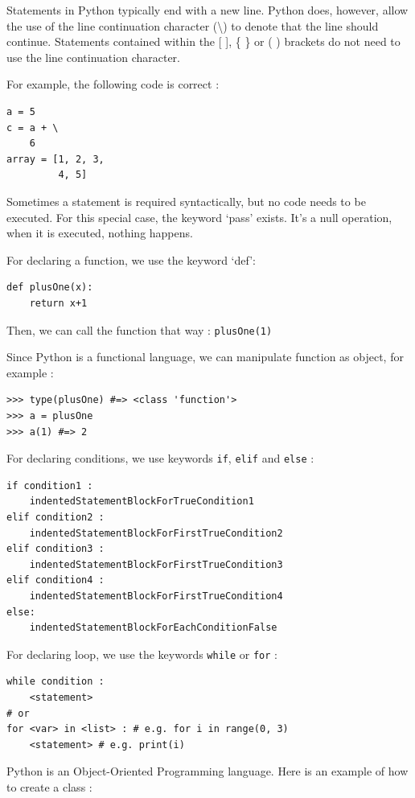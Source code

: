 \documentclass[a4paper,10pt]{article}
\begin{document}
Statements in Python typically end with a new line. Python does, however, allow the use of the line continuation character (\textbackslash) to denote that the line should continue. Statements contained within the [ ], \{ \} or ( ) brackets do not need to use the line continuation character.

For example, the following code is correct :

\begin{lstlisting}
a = 5
c = a + \
    6
array = [1, 2, 3,
         4, 5]
\end{lstlisting}


Sometimes a statement is required syntactically, but no code needs to be executed. For this special case, the keyword ‘pass’ exists. It’s a null operation, when it is executed, nothing happens.

For declaring a function, we use the keyword ‘def’:

\begin{lstlisting}
def plusOne(x):
    return x+1
\end{lstlisting}

Then, we can call the function that way : \lstinline{plusOne(1)}

Since Python is a functional language, we can manipulate function as object, for example :

\begin{lstlisting}
>>> type(plusOne) #=> <class 'function'>
>>> a = plusOne
>>> a(1) #=> 2
\end{lstlisting}

For declaring conditions, we use keywords \lstinline|if|, \lstinline|elif| and \lstinline|else| :

\begin{lstlisting}
if condition1 :
    indentedStatementBlockForTrueCondition1
elif condition2 :
    indentedStatementBlockForFirstTrueCondition2
elif condition3 :
    indentedStatementBlockForFirstTrueCondition3
elif condition4 :
    indentedStatementBlockForFirstTrueCondition4
else:
    indentedStatementBlockForEachConditionFalse
\end{lstlisting}

For declaring loop, we use the keywords \lstinline|while| or \lstinline|for| :
\begin{lstlisting}
while condition :
    <statement>
# or
for <var> in <list> : # e.g. for i in range(0, 3)
    <statement> # e.g. print(i)
\end{lstlisting}

Python is an Object-Oriented Programming language. Here is an example of how to create a class :
\end{document}
